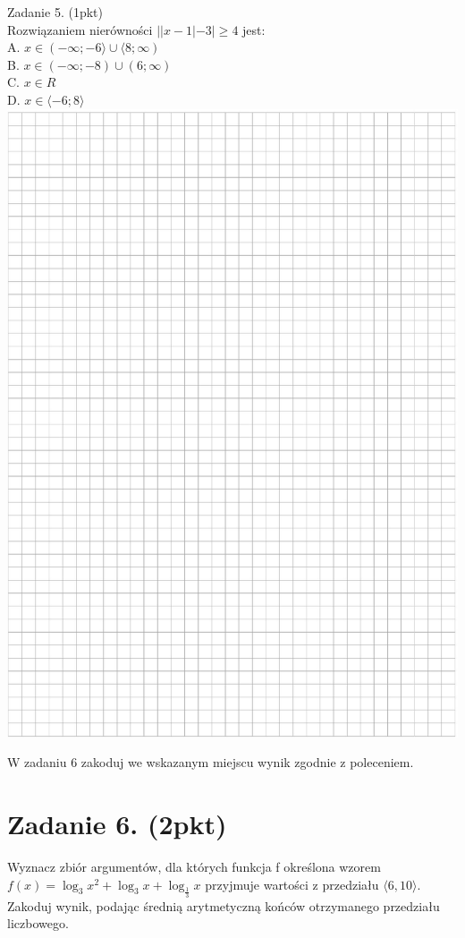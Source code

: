 \documentclass[10pt]{article}
\begin{document}
Zadanie 5. (1pkt)\\
Rozwiązaniem nierówności \(||x-1|-3| \geq 4\) jest:\\
A. \(x \in(-\infty ;-6\rangle \cup\langle 8 ; \infty)\)\\
B. \(x \in(-\infty ;-8) \cup(6 ; \infty)\)\\
C. \(x \in R\)\\
D. \(x \in\langle-6 ; 8\rangle\)\\
\includegraphics[max width=\textwidth, center]{2024_11_21_498389c978c770348ebcg-03}

W zadaniu 6 zakoduj we wskazanym miejscu wynik zgodnie z poleceniem.

\section*{Zadanie 6. (2pkt)}
Wyznacz zbiór argumentów, dla których funkcja f określona wzorem\\
\(f(x)=\log _{3} x^{2}+\log _{3} x+\log _{\frac{1}{3}} x\) przyjmuje wartości z przedziału \(\langle 6,10\rangle\). Zakoduj wynik, podając średnią arytmetyczną końców otrzymanego przedziału liczbowego.
\end{document}
